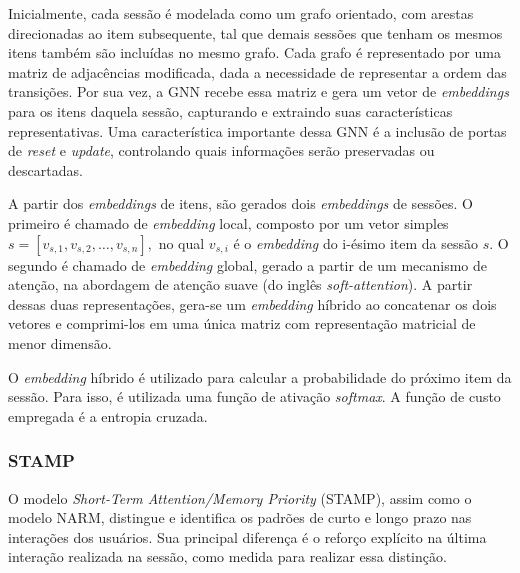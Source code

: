 Inicialmente, cada sessão é modelada como um grafo orientado, com arestas
direcionadas ao item subsequente, tal que demais sessões que tenham os mesmos
itens também são incluídas no mesmo grafo. Cada grafo é representado por uma
matriz de adjacências modificada, dada a necessidade de representar a ordem das
transições. Por sua vez, a GNN recebe essa matriz e gera um vetor de
\textit{embeddings} para os itens daquela sessão, capturando e extraindo suas
características representativas. Uma característica importante dessa GNN é a inclusão
de portas de \textit{reset} e \textit{update}, controlando quais informações
serão preservadas ou descartadas.

A partir dos \textit{embeddings} de itens, são gerados dois \textit{embeddings}
de sessões. O primeiro é chamado de \textit{embedding} local, composto por um
vetor simples $s = [v_{s,1}, v_{s,2}, \ldots, v_{s,n}],$ no qual $v_{s,i}$ é o
\textit{embedding} do i-ésimo item da sessão $s$. O segundo é chamado de
\textit{embedding} global, gerado a partir de um mecanismo de atenção, na
abordagem de atenção suave (do inglês \textit{soft-attention}). A partir dessas
duas representações, gera-se um \textit{embedding} híbrido ao concatenar os dois
vetores e comprimi-los em uma única matriz com representação matricial de menor
dimensão.

O \textit{embedding} híbrido é utilizado para calcular a probabilidade do próximo item
da sessão. Para isso, é utilizada uma função de ativação \textit{softmax}. A função de custo
empregada é a entropia cruzada.

\subsubsection{STAMP}
O modelo \textit{Short-Term Attention/Memory Priority} (STAMP), assim como o
modelo NARM, distingue e identifica os padrões de curto e longo prazo
nas interações dos usuários. Sua principal diferença é o reforço explícito na
última interação realizada na sessão, como medida para realizar essa distinção.

